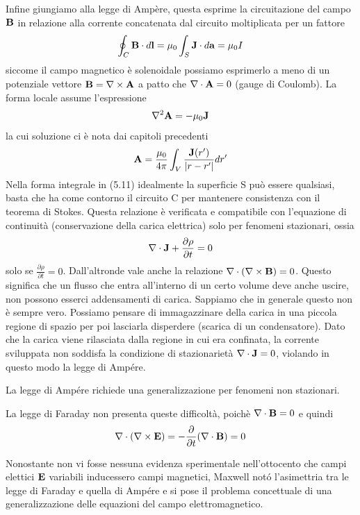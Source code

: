 Infine giungiamo alla legge di Amp\`ere, questa esprime la circuitazione del campo $\bold{B}$ in relazione alla corrente concatenata dal circuito moltiplicata per un fattore 
\begin{equation}
	\oint_{C} \bold{B} \cdot d\bold{l} = \mu_0 \int_{S} \bold{J} \cdot d\bold{a} = \mu_0 I
\end{equation} 
siccome il campo magnetico \`e solenoidale possiamo esprimerlo a meno di un potenziale vettore $\bold{B} = \nabla \times \bold{A}$ a patto che $\nabla \cdot \bold{A} = 0$ (gauge di Coulomb). La forma locale assume l'espressione
\begin{equation*}
	\nabla^2 \bold{A} = - \mu_0 \bold{J}
\end{equation*}
la cui soluzione ci \`e nota dai capitoli precedenti 
\begin{equation*}
	\bold{A} = \frac{\mu_0}{4 \pi} \int_{V} \frac{\bold{J}(r')}{|r-r'|}dr'
\end{equation*}
Nella forma integrale in (5.11) idealmente la superficie S pu\`o essere qualsiasi, basta che ha come contorno il circuito C per mantenere consistenza con il teorema di Stokes.  Questa relazione \`e verificata  e compatibile con l'equazione di continuit\`a (conservazione della carica elettrica) solo per fenomeni stazionari, ossia 
\begin{equation*}
	\nabla \cdot \bold{J} + \frac{\partial \rho}{\partial t}= 0
\end{equation*}
solo se $\frac{\partial \rho}{\partial t} = 0$. Dall'altronde vale anche la relazione $\nabla \cdot (\nabla \times \bold{B}) = 0$. Questo significa che un flusso che entra all'interno di un certo volume deve anche uscire, non possono esserci addensamenti di carica. Sappiamo che in generale questo non \`e sempre vero. Possiamo pensare di immagazzinare della carica in una piccola regione di spazio per poi lasciarla disperdere (scarica di un condensatore). Dato che la carica viene rilasciata dalla regione in cui era confinata, la corrente sviluppata non soddisfa la condizione di stazionariet\`a $\nabla \cdot \bold{J} = 0$, violando in questo modo la legge di Amp\'ere.

La legge di Amp\'ere richiede una generalizzazione per fenomeni non stazionari.

\begin{remark}
La legge di Faraday non presenta queste difficolt\`a, poich\`e $\nabla \cdot \bold{B} = 0$ e quindi 
\begin{equation*}
	\nabla \cdot (\nabla \times \bold{E} ) = - \frac{\partial }{\partial t}(\nabla \cdot \bold{B})= 0
\end{equation*}
\end{remark}
Nonostante non vi fosse nessuna evidenza sperimentale nell'ottocento che campi elettici $\bold{E}$ variabili inducessero campi magnetici, Maxwell not\'o l'asimettria tra le legge di Faraday e quella di Amp\'ere e si pose il problema concettuale di una generalizzazione delle equazioni del campo elettromagnetico.
